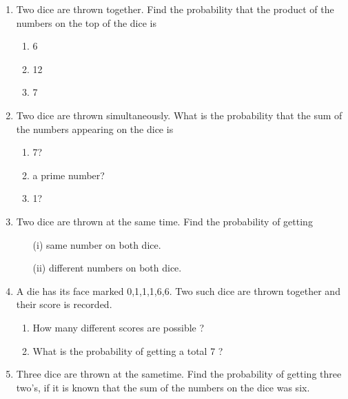 \begin{enumerate}[label=\thesection.\arabic*,ref=\thesection.\theenumi]
	\item Two dice are thrown together. Find the probability that the product of the numbers
on the top of the dice is
\begin{enumerate}
\item 6
\item 12
\item 7
\end{enumerate}
		\solution
		
  \item Two dice are thrown simultaneously. What is the probability that the sum of the numbers appearing on the dice is 
\begin{enumerate}
\item{7?}
\item{a prime number?}
\item{1?}
\end{enumerate}
\solution

\item Two dice are thrown at the same time. Find the probability of getting
\begin{enumerate}
    \item[(i)] same number on both dice.
    \item[(ii)] different numbers on both dice.
\end{enumerate}

\item A die has its face marked 0,1,1,1,6,6. Two such dice are thrown together and their score is recorded.
\begin{enumerate}
	\item How many different scores are possible ?
	\item What is the probability of getting a total 7 ?  
\end{enumerate}

\item Three dice are thrown at the sametime. Find the probability of getting three
two’s, if it is known that the sum of the numbers on the dice was six.

\end{enumerate}
